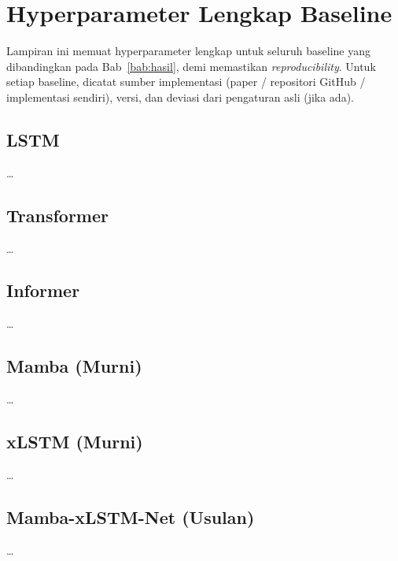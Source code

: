 
\chapter{Hyperparameter Lengkap Baseline}
\label{lamp:hparam}

Lampiran ini memuat hyperparameter lengkap untuk seluruh baseline yang
dibandingkan pada Bab~\ref{bab:hasil}, demi memastikan
\emph{reproducibility}. Untuk setiap baseline, dicatat sumber
implementasi (paper / repositori GitHub / implementasi sendiri),
versi, dan deviasi dari pengaturan asli (jika ada).

\section{LSTM}
\label{lamp:hparam_lstm}
\dots

\section{Transformer}
\label{lamp:hparam_transformer}
\dots

\section{Informer}
\label{lamp:hparam_informer}
\dots

\section{Mamba (Murni)}
\label{lamp:hparam_mamba}
\dots

\section{xLSTM (Murni)}
\label{lamp:hparam_xlstm}
\dots

\section{Mamba-xLSTM-Net (Usulan)}
\label{lamp:hparam_proposed}
\dots
